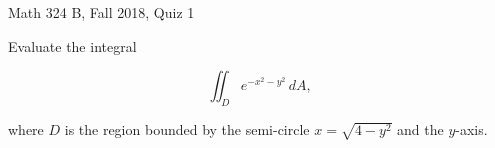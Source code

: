 \documentclass{exam}
\begin{document}
 
\begin{center} \begin{Large} Math 324 B, Fall 2018, Quiz 1\end{Large}
\end{center} 

\vspace{5mm}

\begin{center}
\end{center}

\vspace{1cm}
 

\vspace{1cm}

\begin{questions}
\question Evaluate the integral 

\[
\iint_D e^{-x^2-y^2} \, dA,
\]

where $D$ is the region bounded by the semi-circle $x = \sqrt{4-y^2}$ and the $y$-axis. 

\end{questions}
\end{document}
